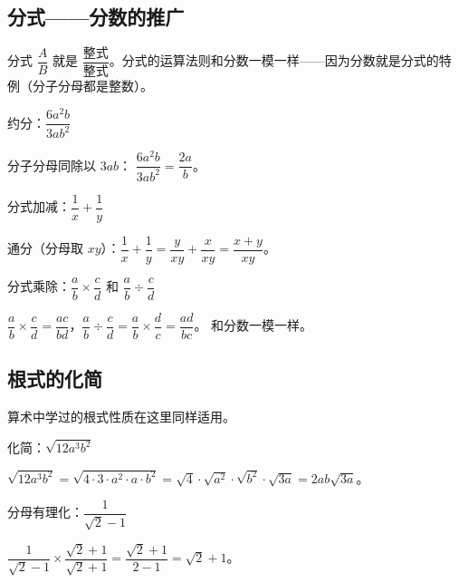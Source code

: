 
\subsection*{分式——分数的推广}

分式 $\dfrac{A}{B}$ 就是 $\dfrac{\text{整式}}{\text{整式}}$。分式的运算法则和分数一模一样——因为分数就是分式的特例（分子分母都是整数）。

\begin{example}
约分：$\dfrac{6a^2b}{3ab^2}$
\end{example}
\begin{solution}
分子分母同除以 $3ab$：
$\dfrac{6a^2b}{3ab^2} = \dfrac{2a}{b}$。
\end{solution}

\begin{example}
分式加减：$\dfrac{1}{x} + \dfrac{1}{y}$
\end{example}
\begin{solution}
通分（分母取 $xy$）：$\dfrac{1}{x} + \dfrac{1}{y} = \dfrac{y}{xy} + \dfrac{x}{xy} = \dfrac{x+y}{xy}$。
\end{solution}

\begin{example}
分式乘除：$\dfrac{a}{b} \times \dfrac{c}{d}$ 和 $\dfrac{a}{b} \div \dfrac{c}{d}$
\end{example}
\begin{solution}
$\dfrac{a}{b} \times \dfrac{c}{d} = \dfrac{ac}{bd}$，$\dfrac{a}{b} \div \dfrac{c}{d} = \dfrac{a}{b} \times \dfrac{d}{c} = \dfrac{ad}{bc}$。
和分数一模一样。
\end{solution}

\subsection*{根式的化简}

算术中学过的根式性质在这里同样适用。

\begin{example}
化简：$\sqrt{12a^3b^2}$
\end{example}
\begin{solution}
$\sqrt{12a^3b^2} = \sqrt{4\cdot3\cdot a^2\cdot a\cdot b^2} = \sqrt{4}\cdot\sqrt{a^2}\cdot\sqrt{b^2}\cdot\sqrt{3a} = 2ab\sqrt{3a}$。
\end{solution}

\begin{example}
分母有理化：$\dfrac{1}{\sqrt{2}-1}$
\end{example}
\begin{solution}
$\dfrac{1}{\sqrt{2}-1} \times \dfrac{\sqrt{2}+1}{\sqrt{2}+1} = \dfrac{\sqrt{2}+1}{2-1} = \sqrt{2}+1$。
\end{solution}


